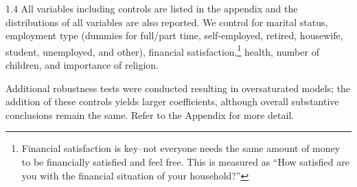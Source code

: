 \documentclass[10pt, letterpaper]{article}
\begin{document}
\begin{spacing}{1.4}
All variables including controls are listed in the appendix and the
distributions of all variables are also reported.
We control for %
marital status, employment type (dummies for full/part time, self-employed,
retired, housewife, student, unemployed, and other), 
financial satisfaction,\footnote{Financial satisfaction is key--not everyone needs the same amount of money to be financially satisfied and feel free. This is measured as ``How satisfied are you with the financial situation of your household?''} health, number of children, and importance of religion.




Additional robustness tests were conducted resulting in oversaturated models; the addition of these controls yields larger coefficients, although overall substantive conclusions remain the same. Refer to the Appendix for more detail.


\end{spacing}
\end{document}
